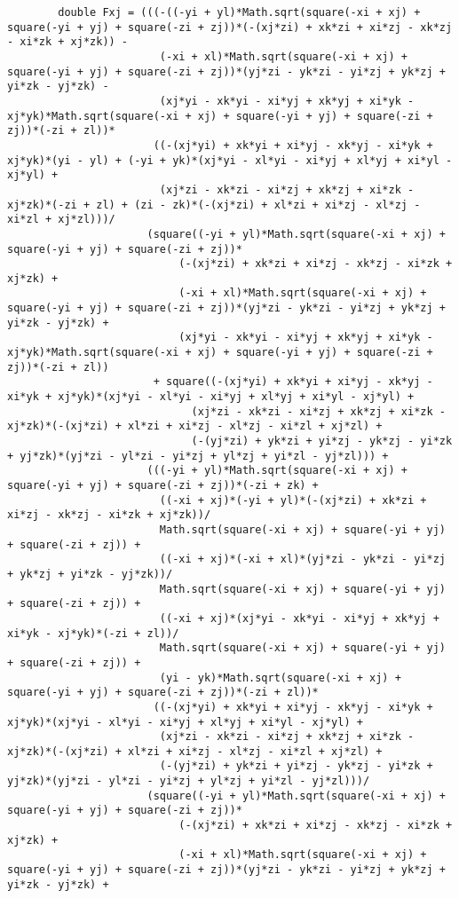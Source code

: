 \begin{lstlisting}
		double Fxj = (((-((-yi + yl)*Math.sqrt(square(-xi + xj) + square(-yi + yj) + square(-zi + zj))*(-(xj*zi) + xk*zi + xi*zj - xk*zj - xi*zk + xj*zk)) - 
						(-xi + xl)*Math.sqrt(square(-xi + xj) + square(-yi + yj) + square(-zi + zj))*(yj*zi - yk*zi - yi*zj + yk*zj + yi*zk - yj*zk) - 
						(xj*yi - xk*yi - xi*yj + xk*yj + xi*yk - xj*yk)*Math.sqrt(square(-xi + xj) + square(-yi + yj) + square(-zi + zj))*(-zi + zl))*
					   ((-(xj*yi) + xk*yi + xi*yj - xk*yj - xi*yk + xj*yk)*(yi - yl) + (-yi + yk)*(xj*yi - xl*yi - xi*yj + xl*yj + xi*yl - xj*yl) + 
						(xj*zi - xk*zi - xi*zj + xk*zj + xi*zk - xj*zk)*(-zi + zl) + (zi - zk)*(-(xj*zi) + xl*zi + xi*zj - xl*zj - xi*zl + xj*zl)))/
					  (square((-yi + yl)*Math.sqrt(square(-xi + xj) + square(-yi + yj) + square(-zi + zj))*
						   (-(xj*zi) + xk*zi + xi*zj - xk*zj - xi*zk + xj*zk) + 
						   (-xi + xl)*Math.sqrt(square(-xi + xj) + square(-yi + yj) + square(-zi + zj))*(yj*zi - yk*zi - yi*zj + yk*zj + yi*zk - yj*zk) + 
						   (xj*yi - xk*yi - xi*yj + xk*yj + xi*yk - xj*yk)*Math.sqrt(square(-xi + xj) + square(-yi + yj) + square(-zi + zj))*(-zi + zl))
					   + square((-(xj*yi) + xk*yi + xi*yj - xk*yj - xi*yk + xj*yk)*(xj*yi - xl*yi - xi*yj + xl*yj + xi*yl - xj*yl) + 
							 (xj*zi - xk*zi - xi*zj + xk*zj + xi*zk - xj*zk)*(-(xj*zi) + xl*zi + xi*zj - xl*zj - xi*zl + xj*zl) + 
							 (-(yj*zi) + yk*zi + yi*zj - yk*zj - yi*zk + yj*zk)*(yj*zi - yl*zi - yi*zj + yl*zj + yi*zl - yj*zl))) + 
					  (((-yi + yl)*Math.sqrt(square(-xi + xj) + square(-yi + yj) + square(-zi + zj))*(-zi + zk) + 
						((-xi + xj)*(-yi + yl)*(-(xj*zi) + xk*zi + xi*zj - xk*zj - xi*zk + xj*zk))/
						Math.sqrt(square(-xi + xj) + square(-yi + yj) + square(-zi + zj)) + 
						((-xi + xj)*(-xi + xl)*(yj*zi - yk*zi - yi*zj + yk*zj + yi*zk - yj*zk))/
						Math.sqrt(square(-xi + xj) + square(-yi + yj) + square(-zi + zj)) + 
						((-xi + xj)*(xj*yi - xk*yi - xi*yj + xk*yj + xi*yk - xj*yk)*(-zi + zl))/
						Math.sqrt(square(-xi + xj) + square(-yi + yj) + square(-zi + zj)) + 
						(yi - yk)*Math.sqrt(square(-xi + xj) + square(-yi + yj) + square(-zi + zj))*(-zi + zl))*
					   ((-(xj*yi) + xk*yi + xi*yj - xk*yj - xi*yk + xj*yk)*(xj*yi - xl*yi - xi*yj + xl*yj + xi*yl - xj*yl) + 
						(xj*zi - xk*zi - xi*zj + xk*zj + xi*zk - xj*zk)*(-(xj*zi) + xl*zi + xi*zj - xl*zj - xi*zl + xj*zl) + 
						(-(yj*zi) + yk*zi + yi*zj - yk*zj - yi*zk + yj*zk)*(yj*zi - yl*zi - yi*zj + yl*zj + yi*zl - yj*zl)))/
					  (square((-yi + yl)*Math.sqrt(square(-xi + xj) + square(-yi + yj) + square(-zi + zj))*
						   (-(xj*zi) + xk*zi + xi*zj - xk*zj - xi*zk + xj*zk) + 
						   (-xi + xl)*Math.sqrt(square(-xi + xj) + square(-yi + yj) + square(-zi + zj))*(yj*zi - yk*zi - yi*zj + yk*zj + yi*zk - yj*zk) + 

\end{lstlisting}
